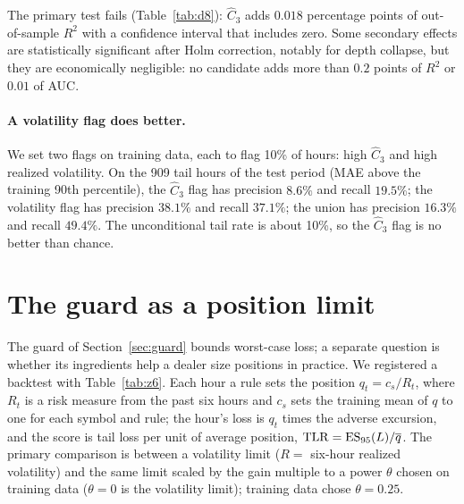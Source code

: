 \documentclass[12pt]{article}
\theoremstyle{definition}
\theoremstyle{remark}
\begin{document}
The primary test fails (Table~\ref{tab:d8}): $\hat C_3$ adds $0.018$ percentage points of out-of-sample $R^2$ with a confidence interval that includes zero. Some secondary effects are statistically significant after Holm correction, notably for depth collapse, but they are economically negligible: no candidate adds more than $0.2$ points of $R^2$ or $0.01$ of AUC.

\paragraph{A volatility flag does better.} We set two flags on training data, each to flag 10\% of hours: high $\hat C_3$ and high realized volatility. On the 909 tail hours of the test period (MAE above the training 90th percentile), the $\hat C_3$ flag has precision $8.6\%$ and recall $19.5\%$; the volatility flag has precision $38.1\%$ and recall $37.1\%$; the union has precision $16.3\%$ and recall $49.4\%$. The unconditional tail rate is about 10\%, so the $\hat C_3$ flag is no better than chance.

\section{The guard as a position limit}
The guard of Section~\ref{sec:guard} bounds worst-case loss; a separate question is whether its ingredients help a dealer size positions in practice. We registered a backtest with Table~\ref{tab:z6}. Each hour a rule sets the position $q_t=c_s/R_t$, where $R_t$ is a risk measure from the past six hours and $c_s$ sets the training mean of $q$ to one for each symbol and rule; the hour's loss is $q_t$ times the adverse excursion, and the score is tail loss per unit of average position, ${\rm TLR}={\rm ES}_{95}(L)/\overline q$. The primary comparison is between a volatility limit ($R=$ six-hour realized volatility) and the same limit scaled by the gain multiple to a power $\theta$ chosen on training data ($\theta=0$ is the volatility limit); training data chose $\theta=0.25$.
\end{document}
